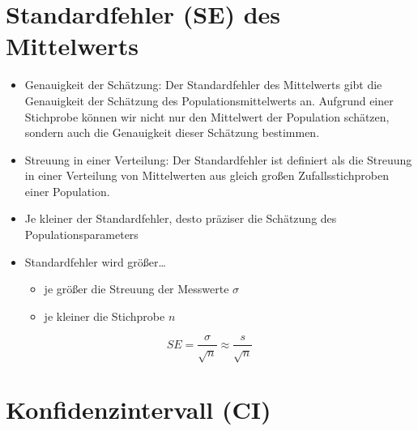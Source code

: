\documentclass[
]{book}
\providecommand{\tightlist}{%
  \setlength{\itemsep}{0pt}\setlength{\parskip}{0pt}}
\begin{document}
\hypertarget{standardfehler-se-des-mittelwerts}{%
\section{Standardfehler (SE) des Mittelwerts}\label{standardfehler-se-des-mittelwerts}}

\begin{itemize}
\tightlist
\item
  Genauigkeit der Schätzung: Der Standardfehler des Mittelwerts gibt die Genauigkeit der Schätzung des Populationsmittelwerts an. Aufgrund einer Stichprobe können wir nicht nur den Mittelwert der Population schätzen, sondern auch die Genauigkeit dieser Schätzung bestimmen.
\item
  Streuung in einer Verteilung: Der Standardfehler ist definiert als die Streuung in einer Verteilung von Mittelwerten aus gleich großen Zufallsstichproben einer Population.
\item
  Je kleiner der Standardfehler, desto präziser die Schätzung des Populationsparameters
\item
  Standardfehler wird größer\ldots{}

  \begin{itemize}
  \tightlist
  \item
    je größer die Streuung der Messwerte \(\sigma\)
  \item
    je kleiner die Stichprobe \(n\)
  \end{itemize}
\end{itemize}

\[ SE = \frac{\sigma}{\sqrt{n}} \approx \frac{s}{\sqrt{n}}\]

\hypertarget{konfidenzintervall-ci}{%
\section{Konfidenzintervall (CI)}\label{konfidenzintervall-ci}}
\end{document}
